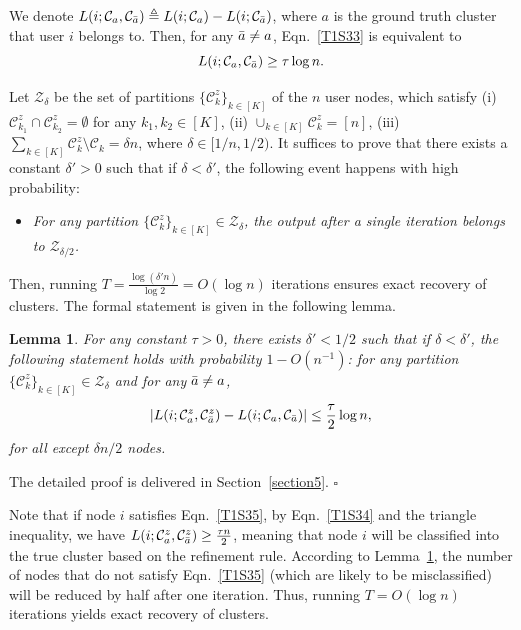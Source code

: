 \documentclass{article}
\newtheorem{lemma}{Lemma}
\newenvironment{proof}{{\noindent\it Proof:}\quad}{\hfill $\square$\par}
\begin{document}
We denote $L(i; \mathcal{C}_a, \mathcal{C}_{\Bar{a}}) \triangleq L(i; \mathcal{C}_a)-L(i; \mathcal{C}_{\Bar{a}})$, where $a$ is the ground truth cluster that user $i$ belongs to. Then, for any $\Bar{a} \neq a$,  Eqn.~\eqref{T1S33} is equivalent to 
\begin{equation}\label{T1S34}
    L(i; \mathcal{C}_a, \mathcal{C}_{\Bar{a}}) \geq \tau \log n.
\end{equation}


Let $\mathcal{Z}_\delta$ be the set of partitions $\{ \mathcal{C}_k^z \}_{k \in [K]}$ of the $n$ user nodes, which satisfy (i) $\mathcal{C}_{k_1}^z \cap \mathcal{C}_{k_2}^z = \emptyset$ for any $k_1, k_2 \in [K]$, (ii) $\cup_{k \in [K]}\mathcal{C}_k^z = [n]$, (iii) $\sum_{k \in [K]} \mathcal{C}_k^z \setminus \mathcal{C}_k = \delta n$, where $\delta \in [ 1/n, 1/2 )$. It suffices to prove that there exists a constant $\delta'>0$ such that if $\delta < \delta'$, the following event happens with high probability: 
\begin{itemize}
    \item \emph{For any partition $\{\mathcal{C}_k^z\}_{k \in [K]} \in \mathcal{Z}_{\delta}$, the output after a single iteration belongs to $\mathcal{Z}_{\delta / 2}$.}
\end{itemize}
Then, running $T=\frac{\log (\delta' n)}{\log 2}=O(\log n)$ iterations ensures exact recovery of clusters. The formal statement  is given in the following lemma.

\begin{lemma}\label{lemma6}
    For any constant $\tau > 0$, there exists $\delta' < 1/2$ such that if $\delta < \delta'$, the following statement holds with probability $1-O(n^{-1})$: 
    for any partition $\{ \mathcal{C}_k^z \}_{k \in [K]} \in \mathcal{Z}_\delta$ and for any $\Bar{a} \neq a$,
    \begin{equation}\label{T1S35}
        |L(i; \mathcal{C}_a^z, \mathcal{C}_{\Bar{a}}^z)-L(i; \mathcal{C}_a, \mathcal{C}_{\Bar{a}})| \leq \frac{\tau}{2} \log n,
    \end{equation}
    for all except $\delta n/2$ nodes.
\end{lemma}
\begin{proof}
    The detailed proof is delivered in Section~\ref{section5}.
\end{proof}

Note that if node $i$ satisfies Eqn.~\eqref{T1S35}, by Eqn.~\eqref{T1S34} and the triangle inequality, we have $L(i; \mathcal{C}_a^z, \mathcal{C}_{\Bar{a}}^z) \ge \frac{\tau n}{2}$, meaning that node  $i$ will be classified into the true cluster based on the refinement rule. According to Lemma~\ref{lemma6}, the number of nodes that do not satisfy Eqn.~\eqref{T1S35} (which are likely to be misclassified) will be reduced by half after one iteration. Thus, running $T=O(\log n)$ iterations yields exact recovery of clusters. 
\end{document}
